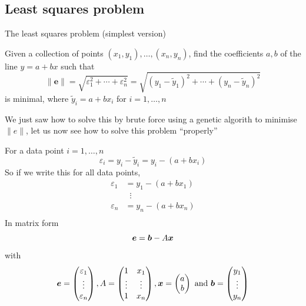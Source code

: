 \documentclass[aspectratio=169]{beamer}\usepackage[]{graphicx}\usepackage[]{xcolor}
\begin{document}
\subsection{Least squares problem}

\begin{frame}{The least squares problem (simplest version)}
	\begin{definition}
		Given a collection of points $(x_1,y_1),\ldots,(x_n,y_n)$, find the coefficients $a,b$ of the line $y=a+bx$ such that
		$$
		\|\mathbf{e}\|=\sqrt{\varepsilon_1^2+\cdots+\varepsilon_n^2}
		=\sqrt{(y_1-\tilde y_1)^2+\cdots+(y_n-\tilde y_n)^2}
		$$
		is minimal, where $\tilde y_i=a+bx_i$ for $i=1,\ldots,n$
	\end{definition}
	\vfill
	We just saw how to solve this by brute force using a genetic algorith to minimise $\|e\|$, let us now see how to solve this problem ``properly''
\end{frame}


\begin{frame}
	For a data point $i=1,\ldots,n$
	\[
	\varepsilon_i = y_i-\tilde y_i = y_i - (a+bx_i)
	\]
	So if we write this for all data points,
	\begin{align*}
	\varepsilon_1 &= y_1 - (a+bx_1) \\
	&\;\;\vdots \\
	\varepsilon_n &= y_n - (a+bx_n) \\
	\end{align*}
	In matrix form
	\[
	\bm{e} = \bm{b}-A\bm{x}
	\]
	with
	\[
	\bm{e} = \begin{pmatrix}
	\varepsilon_1\\ \vdots\\ \varepsilon_n
	\end{pmatrix},
	A=\begin{pmatrix}
	1 & x_1 \\ \vdots & \vdots \\ 1 & x_n
	\end{pmatrix},
	\bm{x} = \begin{pmatrix}
	a\\b
	\end{pmatrix}\textrm{ and }
	\bm{b} = \begin{pmatrix}
	y_1\\ \vdots\\ y_n
	\end{pmatrix}
	\]
\end{frame}
\end{document}
